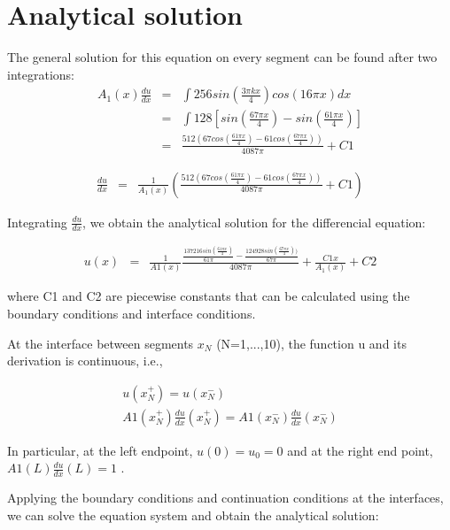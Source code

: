 \documentclass[paper=a4, fontsize=11pt]{article} %
\begin{document}
\section{Analytical solution}

The general solution for this equation on every segment can be found after two integrations:
\begin{eqnarray}
\label{du_ana}
A_1(x)\frac{du}{dx}&=& \int 256sin(\frac{3\pi kx}{4})cos(16 \pi x) dx\nonumber\\
&=& \int 128[sin(\frac{67 \pi x}{4}) - sin(\frac{61 \pi x}{4})]\nonumber\\
&=& \frac{512(67cos(\frac{61\pi x}{4})- 61cos(\frac{67\pi x}{4}))}{4087\pi} + C1
\end{eqnarray}

\begin{eqnarray}
\frac{du}{dx} &=& \frac{1}{A_1(x)} (\frac{ 512( 67cos( \frac{61\pi x}{4} )- 61cos( \frac{67\pi x}{4} ) ) }  {4087\pi} + C1)
\end{eqnarray}

Integrating $\frac{du}{dx}$, we obtain the analytical solution for the differencial equation:

\begin{eqnarray}
u(x)&=& \frac{1}{A1(x)}\frac{\frac{137216sin(\frac{61\pi x}{4})}{61\pi}- \frac{124928sin(\frac{67\pi x}{4}))}{67\pi}}{4087\pi} + \frac{C1x} {A_1(x)} + C2
\end{eqnarray}

where C1 and C2 are piecewise constants that can be calculated using the boundary conditions and interface conditions.

At the interface between segments $x_N$ (N=1,...,10), the function u and its derivation is continuous, i.e.,

\begin{eqnarray}
u(x_N^+) = u(x_N^-) \nonumber\\
A1(x_N^+)\frac{du} {dx}(x_N^+) = A1(x_N^-)\frac{du}{dx}(x_N^-)
\end{eqnarray}


In particular, at the left endpoint, $u(0) = u_0 = 0$ and at the right end point, $A1(L)\frac{du}{dx} (L) = 1$ .

Applying the boundary conditions and continuation conditions at the interfaces, we can solve the equation system and obtain the analytical solution:
\end{document}
